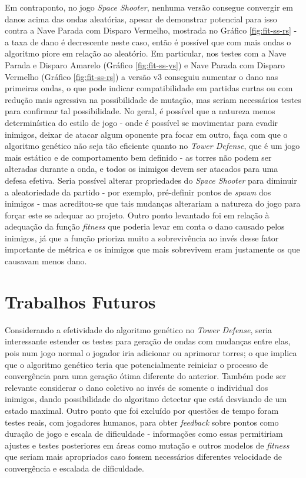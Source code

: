 Em contraponto, no jogo \textit{Space Shooter}, nenhuma versão consegue convergir em danos acima das ondas aleatórias, apesar de demonstrar potencial para isso contra a Nave Parada com Disparo Vermelho, mostrada no Gráfico \ref{fig:fit-ss-rs} - a taxa de dano é decrescente neste caso, então é possível que com mais ondas o algoritmo piore em relação ao aleatório. Em particular, nos testes com a Nave Parada e Disparo Amarelo (Gráfico \ref{fig:fit-ss-ys}) e Nave Parada com Disparo Vermelho (Gráfico \ref{fig:fit-ss-rs}) a versão v3 conseguiu aumentar o dano nas primeiras ondas, o que pode indicar compatibilidade em partidas curtas ou com redução mais agressiva na possibilidade de mutação, mas seriam necessários testes para confirmar tal possibilidade. No geral, é possível que a natureza menos determinística do estilo de jogo - onde é possível se movimentar para evadir inimigos, deixar de atacar algum oponente pra focar em outro, faça com que o algoritmo genético não seja tão eficiente quanto no \textit{Tower Defense}, que é um jogo mais estático e de comportamento bem definido - as torres não podem ser alteradas durante a onda, e todos os inimigos devem ser atacados para uma defesa efetiva. Seria possível alterar propriedades do \textit{Space Shooter} para diminuir a aleatoriedade da partido - por exemplo, pré-definir pontos de \textit{spawn} dos inimigos - mas acreditou-se que tais mudanças alterariam a natureza do jogo para forçar este se adequar ao projeto. Outro ponto levantado foi em relação à adequação da função \textit{fitness} que poderia levar em conta o dano causado pelos inimigos, já que a função prioriza muito a sobrevivência ao invés desse fator importante de métrica e os inimigos que mais sobrevivem eram justamente os que causavam menos dano.

\section{Trabalhos Futuros}
\label{sec:futuro}

Considerando a efetividade do algoritmo genético no \textit{Tower Defense}, seria interessante estender os testes para geração de ondas com mudanças entre elas, pois num jogo normal o jogador iria adicionar ou aprimorar torres; o que implica que o algoritmo genético teria que potencialmente reiniciar o processo de convergência para uma geração ótima diferente do anterior. Também pode ser relevante considerar o dano coletivo ao invés de somente o individual dos inimigos, dando possibilidade do algoritmo detectar que está desviando de um estado maximal. Outro ponto que foi excluído por questões de tempo foram testes reais, com jogadores humanos, para obter \textit{feedback} sobre pontos como duração de jogo e escala de dificuldade - informações como essas permitiriam ajustes e testes posteriores em áreas como mutação e outros modelos de \textit{fitness} que seriam mais apropriados caso fossem necessários diferentes velocidade de convergência e escalada de dificuldade.

